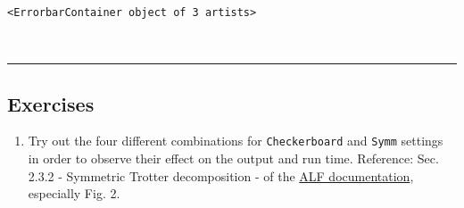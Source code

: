 \documentclass[11pt]{article}
\makeatletter
\providecommand{\tightlist}{%
      \setlength{\itemsep}{0pt}\setlength{\parskip}{0pt}}
\newcommand{\boxspacing}{\kern\kvtcb@left@rule\kern\kvtcb@boxsep}
\newcommand{\prompt}[4]{
        \ttfamily\llap{{\color{#2}[#3]:\hspace{3pt}#4}}\vspace{-\baselineskip}
    }
\makeatother
\begin{document}
            \begin{tcolorbox}[breakable, size=fbox, boxrule=.5pt, pad at break*=1mm, opacityfill=0]
\prompt{Out}{outcolor}{7}{\boxspacing}
\begin{Verbatim}[commandchars=\\\{\}]
<ErrorbarContainer object of 3 artists>
\end{Verbatim}
\end{tcolorbox}
        
    \begin{center}
    \end{center}
    { \hspace*{\fill} \\}
    
    \begin{center}\rule{0.5\linewidth}{0.5pt}\end{center}

\hypertarget{exercises}{%
\subsection{Exercises}\label{exercises}}

\begin{enumerate}
\def\labelenumi{\arabic{enumi}.}
\tightlist
\item
  Try out the four different combinations for \texttt{Checkerboard} and
  \texttt{Symm} settings in order to observe their effect on the output
  and run time. Reference: Sec. 2.3.2 - Symmetric Trotter decomposition
  - of the
  \href{https://git.physik.uni-wuerzburg.de/ALF/ALF/-/blob/ALF-2.2/Documentation/doc.pdf}{ALF
  documentation}, especially Fig. 2.
\end{enumerate}


    
    
    
\end{document}

